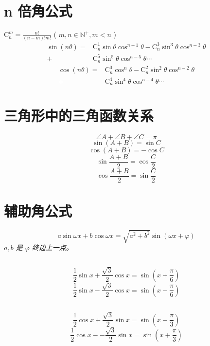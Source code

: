 \documentclass[a4paper, fleqn]{ctexart}
\newcommand{\diform}{\noindent}
\renewcommand{\binom}[2]{\mathrm{C}_{#1}^{#2}}
\begin{document}
\begin{multicols}{2}
		\section{n 倍角公式}
		$ \binom{n}{m} =\frac{n!}{\left( n - m\right)! m!} $
		( $ m, n \in \mathbb{N^+}, m < n $ )
		\begin{align*}
			\sin\left(n\theta\right)
			= & \binom n1\sin\theta\cos^{n-1}\theta
			- \binom n3\sin^{3}\theta\cos^{n-3}\theta \\
			+ & \binom n5\sin^{5}\theta\cos^{n-5}\theta \cdots 
		\end{align*}
		\begin{align*}
			\cos\left(n\theta\right) 
			= & \binom n0\cos^{n}\theta
			- \binom n2\sin^{2}\theta\cos^{n-2}\theta \\
			+ & \binom n4\sin^{4}\theta\cos^{n-4}\theta \cdots
		\end{align*}
		
		\section{三角形中的三角函数关系}
		\diform
		\[\angle A + \angle B + \angle C = \pi \]
		\[ \sin\left (A + B \right ) = \sin C \]
		\[ \cos\left (A + B \right ) = -\cos C \]
		\[ \sin\frac{A + B}{2} = \cos \frac C2 \]
		\[ \cos\frac{A + B}{2} = \sin \frac C2 \]
			
		\section{辅助角公式}
		\diform
		\[ a\sin\omega x + b \cos \omega x
		= \sqrt{a^2 + b^2} \sin \left ( \omega x + \varphi \right ) \]
		\emph{$ a, b $ 是 $\varphi$ 终边上一点。}
		
		\subsection{}
		\diform
		\[ \frac12 \sin x + \frac{\sqrt3} 2 \cos x 
		= \sin \left (x + \frac\pi6\right ) \]
		\[ \frac12 \sin x - \frac{\sqrt3} 2 \cos x 
		= \sin \left (x - \frac\pi6\right ) \]
		\subsection{}
		\diform
		\[ \frac12 \cos x + \frac{\sqrt3} 2 \sin x 
		= \sin \left (x - \frac\pi3\right ) \]
		\[ \frac12 \cos x --\frac{\sqrt3} 2 \sin x 
		= \sin \left (x + \frac\pi3\right ) \]

\end{multicols}
\end{document}
